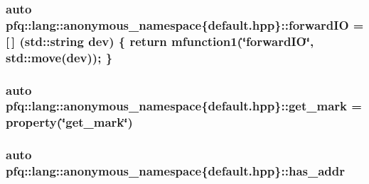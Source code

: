 \hypertarget{namespacepfq_1_1lang_1_1anonymous__namespace_02default_8hpp_03_a3fb6ec42e38c3329534ea3a7024fd967}{
\subsubsection[{forward\+I\+O}]{\setlength{\rightskip}{0pt plus 5cm}auto pfq\+::lang\+::anonymous\+\_\+namespace\{default.\+hpp\}\+::forward\+I\+O = \mbox{[}$\,$\mbox{]} (std\+::string dev) \{ return {\bf mfunction1}(\char`\"{}forward\+I\+O\char`\"{}, std\+::move(dev)); \}}}\label{namespacepfq_1_1lang_1_1anonymous__namespace_02default_8hpp_03_a3fb6ec42e38c3329534ea3a7024fd967}
\hypertarget{namespacepfq_1_1lang_1_1anonymous__namespace_02default_8hpp_03_ab733e24b3ca86450bea0b0888a6327d2}{
\subsubsection[{get\+\_\+mark}]{\setlength{\rightskip}{0pt plus 5cm}auto pfq\+::lang\+::anonymous\+\_\+namespace\{default.\+hpp\}\+::get\+\_\+mark = {\bf property}(\char`\"{}get\+\_\+mark\char`\"{})}}\label{namespacepfq_1_1lang_1_1anonymous__namespace_02default_8hpp_03_ab733e24b3ca86450bea0b0888a6327d2}
\hypertarget{namespacepfq_1_1lang_1_1anonymous__namespace_02default_8hpp_03_a74c6b7e812fb3d312ebf534960a6a91d}{
\subsubsection[{has\+\_\+addr}]{\setlength{\rightskip}{0pt plus 5cm}auto pfq\+::lang\+::anonymous\+\_\+namespace\{default.\+hpp\}\+::has\+\_\+addr}}\label{namespacepfq_1_1lang_1_1anonymous__namespace_02default_8hpp_03_a74c6b7e812fb3d312ebf534960a6a91d}
